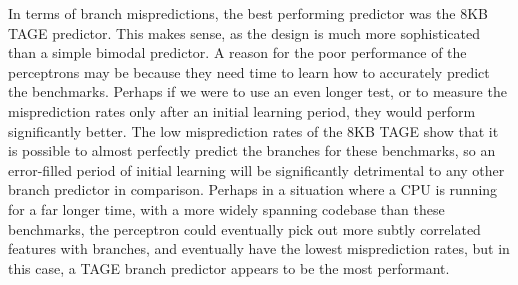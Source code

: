 In terms of branch mispredictions, the best performing predictor was the 8KB TAGE
predictor. This makes sense, as the design is much more sophisticated than a simple
bimodal predictor.
A reason for the poor performance of the perceptrons may be because they need time to learn
how to accurately predict the benchmarks. Perhaps if we were to use an even longer test,
or to measure the misprediction rates only after an initial learning period, they would
perform significantly better. The low misprediction rates of the 8KB TAGE show that it
is possible to almost perfectly predict the branches for these benchmarks, so an error-filled
period of initial learning will be significantly detrimental to any other branch predictor
in comparison.
Perhaps in a situation where a CPU is running for a far longer time, with a more
widely spanning codebase than these benchmarks, the perceptron could
eventually pick out more subtly correlated features with branches, and eventually
have the lowest misprediction rates, but in this case, a TAGE branch predictor
appears to be the most performant.



%
%
%
%
%



